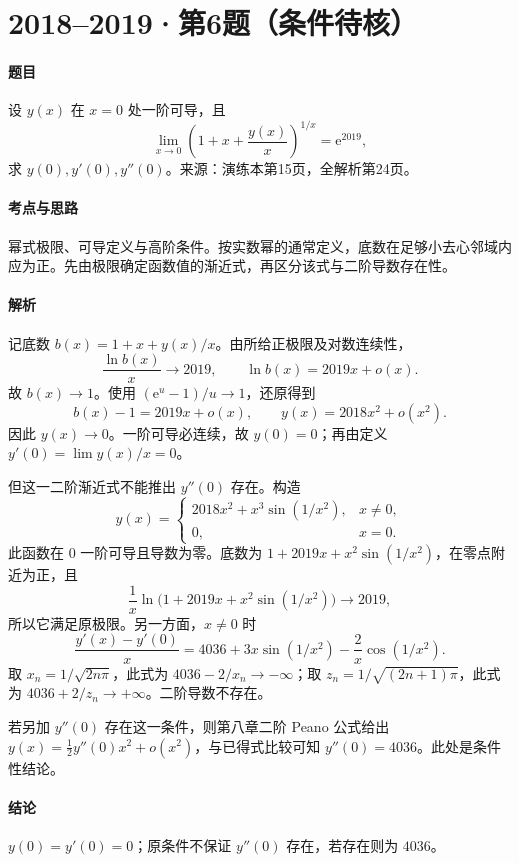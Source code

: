 \documentclass[UTF8,fontset=fandol,12pt,oneside,openany]{ctexrep}
\newcommand{\ee}{\mathrm e}
\theoremstyle{definition}
\begin{document}
\par\addvspace{18pt}\noindent\begin{minipage}{\linewidth}
\section{2018--2019·第6题（条件待核）}
\paragraph{题目}设 $y(x)$ 在 $x=0$ 处一阶可导，且
\[
 \lim_{x\to0}\left(1+x+\frac{y(x)}x\right)^{1/x}=\ee^{2019},
\]
求 $y(0),y'(0),y''(0)$。来源：演练本第15页，全解析第24页。
\end{minipage}\par
\paragraph{考点与思路}幂式极限、可导定义与高阶条件。按实数幂的通常定义，底数在足够小去心邻域内应为正。先由极限确定函数值的渐近式，再区分该式与二阶导数存在性。
\paragraph{解析}记底数 $b(x)=1+x+y(x)/x$。由所给正极限及对数连续性，
\[
 \frac{\ln b(x)}x\to2019,
 \qquad\ln b(x)=2019x+o(x).
\]
故 $b(x)\to1$。使用 $(\ee^u-1)/u\to1$，还原得到
\[
 b(x)-1=2019x+o(x),\qquad
 y(x)=2018x^2+o(x^2).
\]
因此 $y(x)\to0$。一阶可导必连续，故 $y(0)=0$；再由定义 $y'(0)=\lim y(x)/x=0$。

但这一二阶渐近式不能推出 $y''(0)$ 存在。构造
\[
 y(x)=\begin{cases}2018x^2+x^3\sin(1/x^2),&x\ne0,\\0,&x=0.\end{cases}
\]
此函数在 $0$ 一阶可导且导数为零。底数为
$1+2019x+x^2\sin(1/x^2)$，在零点附近为正，且
\[
 \frac1x\ln\big(1+2019x+x^2\sin(1/x^2)\big)\to2019,
\]
所以它满足原极限。另一方面，$x\ne0$ 时
\[
 \frac{y'(x)-y'(0)}x
 =4036+3x\sin(1/x^2)-\frac2x\cos(1/x^2).
\]
取 $x_n=1/\sqrt{2n\pi}$，此式为 $4036-2/x_n\to-\infty$；取 $z_n=1/\sqrt{(2n+1)\pi}$，此式为 $4036+2/z_n\to+\infty$。二阶导数不存在。

若另加 $y''(0)$ 存在这一条件，则第八章二阶 Peano 公式给出
$y(x)=\tfrac12 y''(0)x^2+o(x^2)$，与已得式比较可知 $y''(0)=4036$。此处是条件性结论。
\paragraph{结论}$y(0)=y'(0)=0$；原条件不保证 $y''(0)$ 存在，若存在则为 $4036$。
\end{document}
